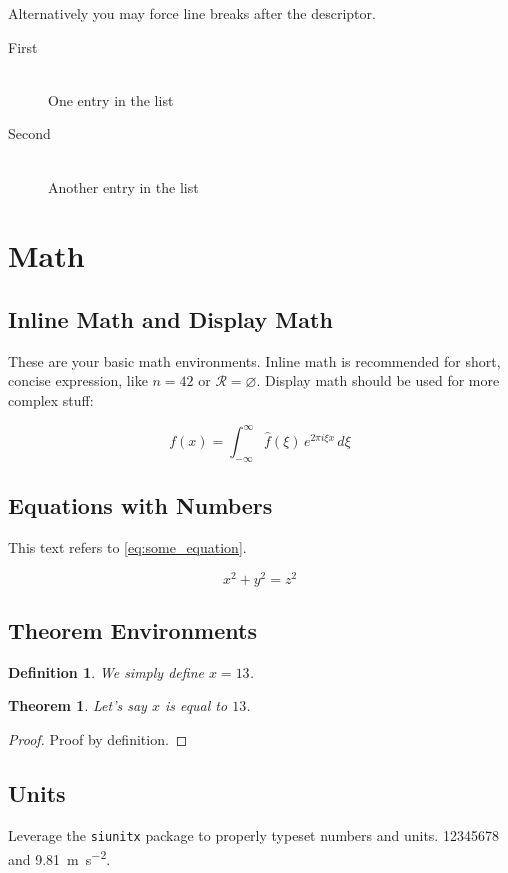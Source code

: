 \documentclass[parskip=half]{scrbook}
\newtheorem{definition}{Definition}[section]
\newtheorem{theorem}{Theorem}
\let\emptyset\varnothing
\begin{document}
Alternatively you may force line breaks after the descriptor.

\begin{description}
	\item[First]\hfill\\
	      One entry in the list
	\item[Second]\hfill\\
	      Another entry in the list
\end{description}

\section{Math}

\subsection{Inline Math and Display Math}

These are your basic math environments.
Inline math is recommended for short, concise expression, like $n = 42$ or $\mathcal{R} = \emptyset$.
Display math should be used for more complex stuff:

$$f(x) = \int_{-\infty}^\infty \hat f(\xi)\,e^{2 \pi i \xi x} \,d\xi$$

\subsection{Equations with Numbers}

This text refers to \cref{eq:some_equation}.

\begin{equation}\label{eq:some_equation}
	x^2 + y^2 = z^2
\end{equation}

\subsection{Theorem Environments}

\begin{definition}
	We simply define $x = 13$.
\end{definition}

\begin{theorem}
	Let's say $x$ is equal to $13$.
\end{theorem}

\begin{proof}
	Proof by definition.
\end{proof}

\subsection{Units}

Leverage the \texttt{siunitx} package to properly typeset numbers and units.
\num{12345678} and \SI{9.81}{\meter\per\second^2}.

\backmatter

\end{document}
